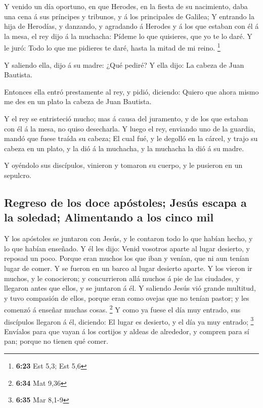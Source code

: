  Y venido un día oportuno, en que Herodes, en la fiesta de
su nacimiento, daba una cena á sus príncipes y tribunos, y á los
principales de Galilea;  Y entrando la hija de Herodías, y
danzando, y agradando á Herodes y á los que estaban con él á la mesa, el
rey dijo á la muchacha: Pídeme lo que quisieres, que yo te lo daré.
 Y le juró: Todo lo que me pidieres te daré, hasta la mitad
de mi reino. \footnote{\textbf{6:23} Est 5,3; Est 5,6}

 Y saliendo ella, dijo á su madre: ¿Qué pediré? Y ella
dijo: La cabeza de Juan Bautista.

 Entonces ella entró prestamente al rey, y pidió, diciendo:
Quiero que ahora mismo me des en un plato la cabeza de Juan Bautista.

 Y el rey se entristeció mucho; mas á causa del juramento,
y de los que estaban con él á la mesa, no quiso desecharla.
 Y luego el rey, enviando uno de la guardia, mandó que
fuese traída su cabeza;  El cual fué, y le degolló en la
cárcel, y trajo su cabeza en un plato, y la dió á la muchacha, y la
muchacha la dió á su madre.

 Y oyéndolo sus discípulos, vinieron y tomaron su cuerpo, y
le pusieron en un sepulcro.

\hypertarget{regreso-de-los-doce-apuxf3stoles-jesuxfas-escapa-a-la-soledad-alimentando-a-los-cinco-mil}{%
\subsection{Regreso de los doce apóstoles; Jesús escapa a la soledad;
Alimentando a los cinco
mil}\label{regreso-de-los-doce-apuxf3stoles-jesuxfas-escapa-a-la-soledad-alimentando-a-los-cinco-mil}}

 Y los apóstoles se juntaron con Jesús, y le contaron todo
lo que habían hecho, y lo que habían enseñado.  Y él les
dijo: Venid vosotros aparte al lugar desierto, y reposad un poco. Porque
eran muchos los que iban y venían, que ni aun tenían lugar de comer.
 Y se fueron en un barco al lugar desierto aparte.
 Y los vieron ir muchos, y le conocieron; y concurrieron
allá muchos á pie de las ciudades, y llegaron antes que ellos, y se
juntaron á él.  Y saliendo Jesús vió grande multitud, y
tuvo compasión de ellos, porque eran como ovejas que no tenían pastor; y
les comenzó á enseñar muchas cosas. \footnote{\textbf{6:34} Mat 9,36}
 Y como ya fuese el día muy entrado, sus discípulos
llegaron á él, diciendo: El lugar es desierto, y el día ya muy entrado;
\footnote{\textbf{6:35} Mar 8,1-9}  Envíalos para que vayan
á los cortijos y aldeas de alrededor, y compren para sí pan; porque no
tienen qué comer.

